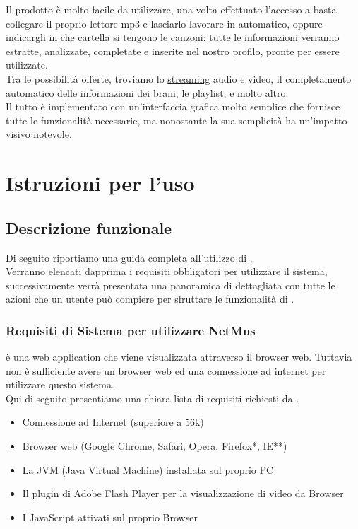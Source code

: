 Il prodotto \`e molto facile da utilizzare, una volta effettuato l'accesso
a  basta collegare il proprio lettore mp3 e lasciarlo lavorare in
automatico, oppure indicargli in che cartella si tengono le canzoni: tutte le 
informazioni verranno estratte, analizzate, completate e
inserite nel nostro profilo, pronte per essere utilizzate.\\

Tra le possibilit\`a offerte, troviamo lo \underline{streaming} audio e video,
il completamento automatico delle informazioni dei brani, le playlist, e molto altro.\\

Il tutto \`e implementato con un'interfaccia grafica molto semplice che fornisce
tutte le funzionalit\`a necessarie, ma nonostante la sua semplicit\`a ha
un'impatto visivo notevole.

\chapter{Istruzioni per l'uso}
\thispagestyle{fancy}

\section{Descrizione funzionale}

Di seguito riportiamo una guida completa all'utilizzo di .\\
Verranno elencati dapprima i requisiti obbligatori per utilizzare il sistema,
successivamente verr\`a presentata una panoramica di  dettagliata con
tutte le azioni che un utente pu\`o compiere per sfruttare le funzionalit\`a di
.

\subsection{Requisiti di Sistema per utilizzare NetMus}
 \`e una web application che viene visualizzata attraverso il browser
web. Tuttavia non \`e sufficiente avere un browser web ed una connessione ad
internet per utilizzare questo sistema. 
\\
Qui di seguito presentiamo una chiara lista di
requisiti richiesti da .

\begin{itemize}
  \item Connessione ad Internet (superiore a 56k)
  \item Browser web (Google Chrome, Safari, Opera, Firefox*, IE**)
  \item La JVM (Java Virtual Machine) installata sul proprio PC
  \item Il plugin di Adobe Flash Player per la visualizzazione di video da
  Browser
  \item I JavaScript attivati sul proprio Browser
\end{itemize}

